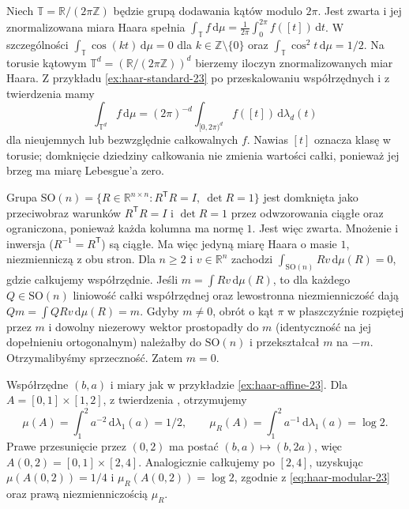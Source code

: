\begin{przyklad}
Niech $\mathbb T=\mathbb{R}/(2\pi\mathbb Z)$ będzie grupą dodawania kątów modulo $2\pi$. Jest zwarta i jej znormalizowana miara Haara spełnia
$\int_{\mathbb T}f\,\mathrm d\mu=\frac1{2\pi}\int_0^{2\pi}f([t])\,\mathrm dt$. W szczególności $\int_{\mathbb T}\cos(kt)\,\mathrm d\mu=0$ dla $k\in\mathbb Z\setminus\{0\}$ oraz $\int_{\mathbb T}\cos^2t\,\mathrm d\mu=1/2$. Na torusie kątowym $\mathbb T^d=(\mathbb R/(2\pi\mathbb Z))^d$
bierzemy iloczyn znormalizowanych miar Haara.
Z przykładu \ref{ex:haar-standard-23} po przeskalowaniu
współrzędnych i z twierdzenia
 mamy
\[
 \int_{\mathbb T^d}f\,\mathrm d\mu
 =(2\pi)^{-d}\int_{[0,2\pi)^d}f([t])\,\mathrm d\lambda_d(t)
\]
dla nieujemnych lub bezwzględnie całkowalnych $f$.
Nawias $[t]$ oznacza klasę w torusie; domknięcie
dziedziny całkowania nie zmienia wartości całki,
ponieważ jej brzeg ma miarę Lebesgue'a zero.
\end{przyklad}
\begin{przyklad}
Grupa $\mathrm{SO}(n)=\{R\in\mathbb{R}^{n\times n}:R^{\mathsf T}R=I,\ \det R=1\}$ jest domknięta jako przeciwobraz warunków
$R^{\mathsf T}R=I$ i $\det R=1$ przez odwzorowania
ciągłe oraz ograniczona, ponieważ każda kolumna
ma normę $1$. Jest więc zwarta. Mnożenie i inwersja
($R^{-1}=R^{\mathsf T}$) są ciągłe. Ma więc jedyną miarę Haara o masie $1$, niezmienniczą z obu stron. Dla $n\ge2$ i $v\in\mathbb{R}^n$ zachodzi $\int_{\mathrm{SO}(n)}Rv\,\mathrm d\mu(R)=0$, gdzie całkujemy współrzędnie. Jeśli $m=\int Rv\,\mathrm d\mu(R)$, to dla
każdego $Q\in\mathrm{SO}(n)$ liniowość całki
współrzędnej oraz lewostronna niezmienniczość dają
$Qm=\int QRv\,\mathrm d\mu(R)=m$.
Gdyby $m\ne0$, obrót o kąt $\pi$ w płaszczyźnie
rozpiętej przez $m$ i dowolny niezerowy wektor
prostopadły do $m$ (identyczność na jej dopełnieniu
ortogonalnym) należałby do $\mathrm{SO}(n)$
i przekształcał $m$ na $-m$. Otrzymalibyśmy
sprzeczność. Zatem $m=0$.
\end{przyklad}
\begin{przyklad}
Współrzędne $(b,a)$ i miary jak w przykładzie \ref{ex:haar-affine-23}. Dla $A=[0,1]\times[1,2]$, z twierdzenia
, otrzymujemy
\[
 \mu(A)=\int_1^2 a^{-2}\,\mathrm d\lambda_1(a)=1/2,
 \qquad
 \mu_R(A)=\int_1^2 a^{-1}\,\mathrm d\lambda_1(a)=\log2.
\]
Prawe przesunięcie przez $(0,2)$ ma postać
$(b,a)\mapsto(b,2a)$, więc $A(0,2)=[0,1]\times[2,4]$.
Analogicznie całkujemy po $[2,4]$, uzyskując
$\mu(A(0,2))=1/4$ i $\mu_R(A(0,2))=\log2$,
zgodnie z \eqref{eq:haar-modular-23} oraz prawą
niezmienniczością $\mu_R$. 
\end{przyklad}
